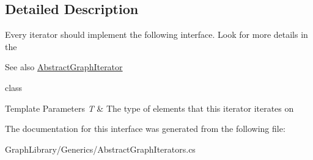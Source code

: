 \subsection{Detailed Description}
Every iterator should implement the following interface. Look for more details in the \begin{DoxySeeAlso}{See also}
\hyperlink{class_graph_library_1_1_generics_1_1_abstract_graph_iterator}{Abstract\+Graph\+Iterator}


\end{DoxySeeAlso}
class 


\begin{DoxyTemplParams}{Template Parameters}
{\em T} & The type of elements that this iterator iterates on\\
\hline
\end{DoxyTemplParams}


The documentation for this interface was generated from the following file\+:\begin{DoxyCompactItemize}
\item 
Graph\+Library/\+Generics/Abstract\+Graph\+Iterators.\+cs\end{DoxyCompactItemize}
